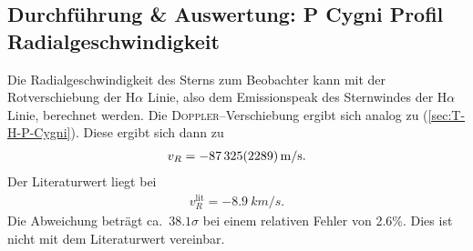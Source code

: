 \subsection{Durchführung \& Auswertung: P Cygni Profil\\Radialgeschwindigkeit} \label{sec:D-A-vR}
Die Radialgeschwindigkeit des Sterns zum Beobachter kann mit der Rotverschiebung der H$\alpha $ Linie, also dem Emissionspeak des Sternwindes der H$\alpha $ Linie, berechnet werden.
Die \textsc{Doppler}--Verschiebung ergibt sich analog zu (\ref{sec:T-H-P-Cygni}).
Diese ergibt sich dann zu
\begin{align} 
  v_R=-\SI{87325+-2289}{m/s}
.\end{align}
Der Literaturwert liegt bei\cite{pcygniRadialvelocity}
\begin{align} 
  v_R^\text{lit}=\SI{-8.9}{km/s}
.\end{align} 
Die Abweichung beträgt ca.\ $38.1\sigma $ bei einem relativen Fehler von 2.6\%. %
Dies ist nicht mit dem Literaturwert vereinbar.


